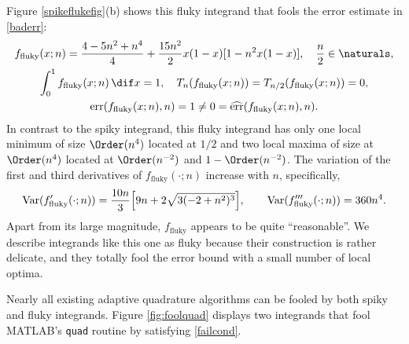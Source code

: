 \documentclass[]{article}
\DeclareMathOperator{\Var}{Var}
\DeclareMathOperator{\err}{err}
\newcommand{\herr}{\widehat{\err}}
\theoremstyle{definition}
\theoremstyle{remark}
\begin{document}
Figure \ref{spikeflukefig}(b) shows this fluky integrand that fools the error estimate in \eqref{baderr}:
\begin{subequations} \label{fluky}
\begin{gather} 
f_{\text{fluky}}(x;n) = \frac{4 - 5 n^2 + n^4}{4}+ \frac{15n^2}{2} x(1-x)[1 - n^2 x(1-x)], \quad \frac{n}{2} \in \naturals, \\
\int_0^1 f_{\text{fluky}}(x;n) \, \dif x =  1, \quad T_{n}(f_{\text{fluky}}(x;n))=T_{n/2}(f_{\text{fluky}}(x;n)) = 0, \\
\label{failcond}
\err(f_{\text{fluky}}(x;n),n)=1 \ne 0 = \herr(f_{\text{fluky}}(x;n),n).
\end{gather}
\end{subequations}
In contrast to the spiky integrand, this fluky integrand has only one local minimum of size $\Order(n^4)$ located at $1/2$ and two local maxima of size at $\Order(n^4)$ located at $\Order(n^{-2})$ and $1-\Order(n^{-2})$.  The variation of the first and third derivatives of $f_{\text{fluky}}(\cdot;n)$ increase with $n$, specifically,
\begin{equation*}
\Var(f'_{\text{fluky}}(\cdot;n))= \frac{10 n}{3}  \Bigl[9 n + 2 \sqrt{3(-2 + n^2)^3} \Bigr ], \qquad
\Var(f'''_{\text{fluky}}(\cdot;n))= 360n^4.
\end{equation*}
Apart from its large magnitude, $f_{\text{fluky}}$ appears to be quite ``reasonable''.  We describe integrands like this one as fluky because their construction is rather delicate, and they totally fool the error bound with a small number of local optima.

Nearly all existing adaptive quadrature algorithms can be fooled by both spiky and fluky integrands.  Figure \ref{fig:foolquad} displays two integrands that fool MATLAB's {\tt quad} routine by satisfying \eqref{failcond}.
\end{document}
